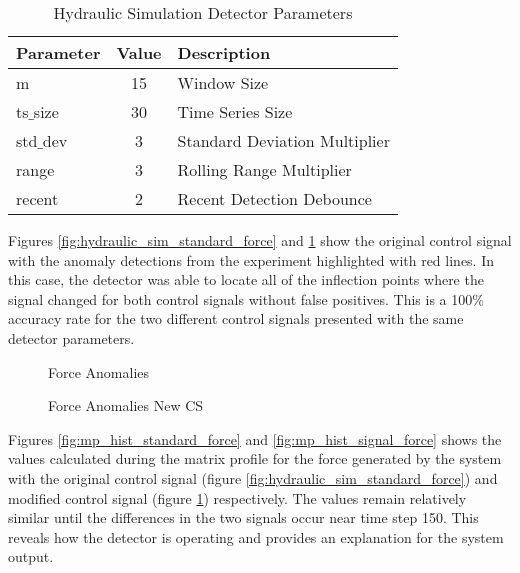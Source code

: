 \begin{table}[H]
\centering
\begin{tabular}{|l|c|l|}
    \hline
	\textbf{Parameter} & \textbf{Value} & \textbf{Description} \\ \hline
	m & 15 & Window Size \\ \hline
	ts$\_$size & 30 & Time Series Size \\ \hline
	std$\_$dev & 3 & Standard Deviation Multiplier \\ \hline
	range & 3 & Rolling Range Multiplier\\ \hline
	recent & 2 & Recent Detection Debounce\\ \hline
\end{tabular}
\caption{Hydraulic Simulation Detector Parameters}
\label{tab:hydraulic_sim_params}
\end{table}

Figures \ref{fig:hydraulic_sim_standard_force} and \ref{fig:hydraulic_sim_signal_force} show the original control signal with the anomaly detections from the experiment highlighted with red lines. In this case, the detector was able to locate all of the inflection points where the signal changed for both control signals without false positives. This is a 100\% accuracy rate for the two different control signals presented with the same detector parameters.

\begin{figure}[H]
    \begin{minipage}[t]{0.5\linewidth}
        \centering
        \resizebox{\linewidth}{!}{}
        \caption{Force Anomalies}
        \label{fig:hydraulic_sim_standard_force}
    \end{minipage}
    \begin{minipage}[t]{0.5\linewidth}
        \centering
        \resizebox{\linewidth}{!}{}
        \caption{Force Anomalies New CS}
        \label{fig:hydraulic_sim_signal_force}
    \end{minipage}
\end{figure}

Figures \ref{fig:mp_hist_standard_force} and \ref{fig:mp_hist_signal_force} shows the values calculated during the matrix profile for the force generated by the system with the original control signal (figure \ref{fig:hydraulic_sim_standard_force}) and modified control signal (figure \ref{fig:hydraulic_sim_signal_force}) respectively. The values remain relatively similar until the differences in the two signals occur near time step 150. This reveals how the detector is operating and provides an explanation for the system output. 

